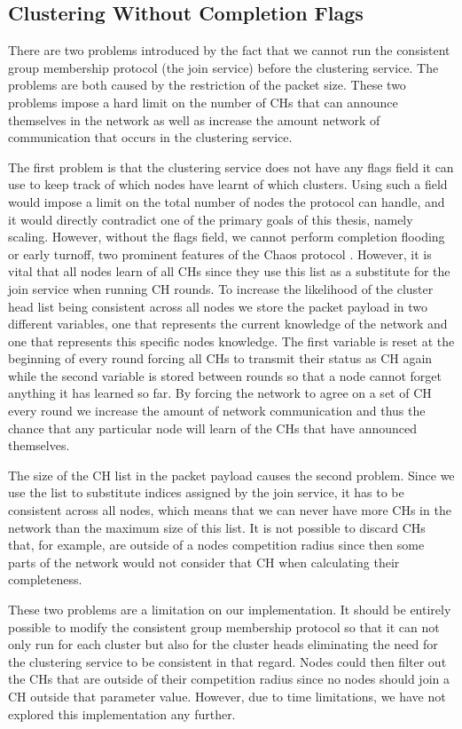 \subsection{Clustering Without Completion Flags}
There are two problems introduced by the fact that we cannot run the consistent group membership protocol (the join service) before the clustering service. The problems are both caused by the restriction of the packet size. These two problems impose a hard limit on the number of CHs that can announce themselves in the network as well as increase the amount network of communication that occurs in the clustering service.

The first problem is that the clustering service does not have any flags field it can use to keep track of which nodes have learnt of which clusters. Using such a field would impose a limit on the total number of nodes the protocol can handle, and it would directly contradict one of the primary goals of this thesis, namely scaling. However, without the flags field, we cannot perform completion flooding or early turnoff, two prominent features of the Chaos protocol \cite{chaos-introduction-paper}. However, it is vital that all nodes learn of all CHs since they use this list as a substitute for the join service when running CH rounds. To increase the likelihood of the cluster head list being consistent across all nodes we store the packet payload in two different variables, one that represents the current knowledge of the network and one that represents this specific nodes knowledge. The first variable is reset at the beginning of every round forcing all CHs to transmit their status as CH again while the second variable is stored between rounds so that a node cannot forget anything it has learned so far.  By forcing the network to agree on a set of CH every round we increase the amount of network communication and thus the chance that any particular node will learn of the CHs that have announced themselves.

The size of the CH list in the packet payload causes the second problem. Since we use the list to substitute indices assigned by the join service, it has to be consistent across all nodes, which means that we can never have more CHs in the network than the maximum size of this list. It is not possible to discard CHs that, for example, are outside of a nodes competition radius since then some parts of the network would not consider that CH when calculating their completeness.

These two problems are a limitation on our implementation. It should be entirely possible to modify the consistent group membership protocol so that it can not only run for each cluster but also for the cluster heads eliminating the need for the clustering service to be consistent in that regard. Nodes could then filter out the CHs that are outside of their competition radius since no nodes should join a CH outside that parameter value. However, due to time limitations, we have not explored this implementation any further.




